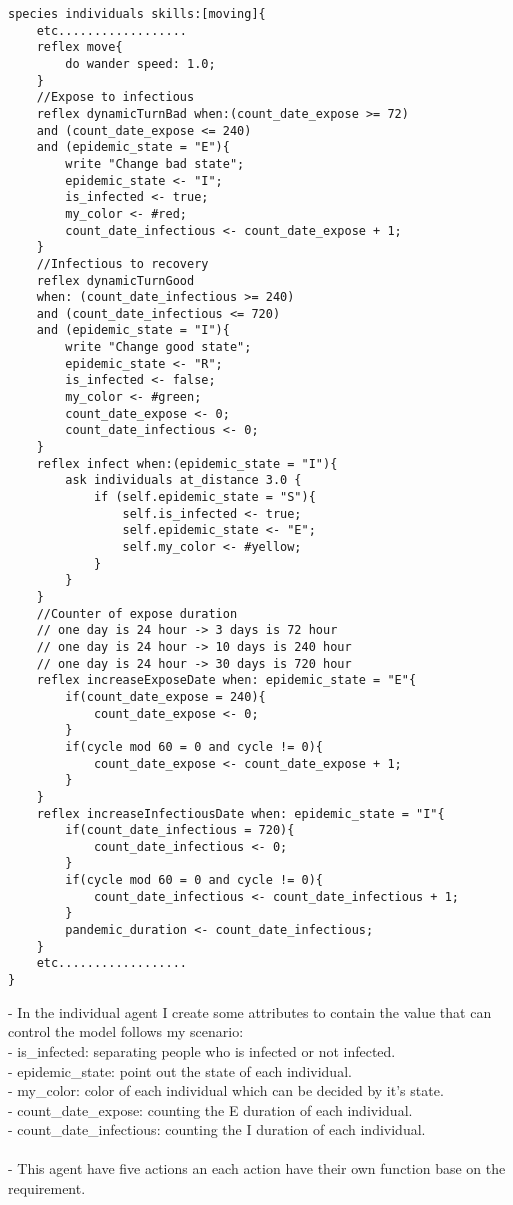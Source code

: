 \documentclass{article}
\begin{document}
\begin{tcolorbox}
\begin{lstlisting}
species individuals skills:[moving]{
	etc..................
	reflex move{
		do wander speed: 1.0;
	}
	//Expose to infectious
	reflex dynamicTurnBad when:(count_date_expose >= 72) 
	and (count_date_expose <= 240) 
	and (epidemic_state = "E"){
		write "Change bad state";
		epidemic_state <- "I";
		is_infected <- true;
		my_color <- #red;
		count_date_infectious <- count_date_expose + 1;
	}
	//Infectious to recovery
	reflex dynamicTurnGood 
	when: (count_date_infectious >= 240) 
	and (count_date_infectious <= 720) 
	and (epidemic_state = "I"){
		write "Change good state";
		epidemic_state <- "R";
		is_infected <- false;
		my_color <- #green;
		count_date_expose <- 0;
		count_date_infectious <- 0;
	}
	reflex infect when:(epidemic_state = "I"){
		ask individuals at_distance 3.0 {
			if (self.epidemic_state = "S"){
				self.is_infected <- true;
				self.epidemic_state <- "E";
				self.my_color <- #yellow;
			}
		}
	}
	//Counter of expose duration
	// one day is 24 hour -> 3 days is 72 hour
	// one day is 24 hour -> 10 days is 240 hour
	// one day is 24 hour -> 30 days is 720 hour
	reflex increaseExposeDate when: epidemic_state = "E"{
		if(count_date_expose = 240){
			count_date_expose <- 0;
		}
		if(cycle mod 60 = 0 and cycle != 0){
			count_date_expose <- count_date_expose + 1;
		}
	}
	reflex increaseInfectiousDate when: epidemic_state = "I"{
		if(count_date_infectious = 720){
			count_date_infectious <- 0;
		}
		if(cycle mod 60 = 0 and cycle != 0){
			count_date_infectious <- count_date_infectious + 1;
		}
		pandemic_duration <- count_date_infectious;
	}
	etc..................
}
\end{lstlisting}
\end{tcolorbox}
- In the individual agent I create some attributes to contain the value that can control the model follows my scenario:
\\
- is\_infected: separating people who is infected or not infected.
\\
- epidemic\_state: point out the state of each individual.
\\
-	my\_color: color of each individual which can be decided by it's state.
\\
-	count\_date\_expose: counting the E duration of each individual.
\\
- count\_date\_infectious: counting the I duration of each individual.
\\\\
- This agent have five actions an each action have their own function base on the requirement.
\end{document}
